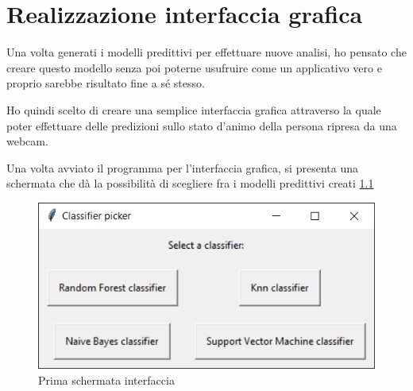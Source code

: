 \chapter{Realizzazione interfaccia grafica}
Una volta generati i modelli predittivi per effettuare nuove analisi, ho pensato che creare questo modello senza poi poterne usufruire come un applicativo vero e proprio sarebbe risultato fine a sé stesso.

Ho quindi scelto di creare una semplice interfaccia grafica attraverso la quale poter effettuare delle predizioni sullo stato d’animo della persona ripresa da una webcam.

Una volta avviato il programma per l’interfaccia grafica, si presenta una schermata che dà la possibilità di scegliere fra i modelli predittivi creati \ref{fig:image16}

\begin{figure}
    \begin{center}    
        \includegraphics[width=0.9\linewidth]{images/image51.png}
        \caption{Prima schermata interfaccia}
        \label{fig:image16}
    \end{center}
\end{figure}

